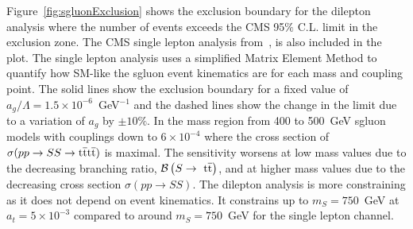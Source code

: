 


Figure~\ref{fig:sgluonExclusion} shows the exclusion boundary for the dilepton analysis where the number of events exceeds the CMS 95$\%$ C.L. limit in the exclusion zone. The CMS single lepton analysis from~\cite{Chatrchyan:2013fea,Beck201548}, is also included in the plot. The single lepton analysis uses a simplified Matrix Element Method to quantify how SM-like the sgluon event kinematics are for each mass and coupling point. The solid lines show the exclusion boundary for a fixed value of $a_{g}/\Lambda = 1.5 \times 10^{-6}$~GeV$^{-1}$ and the dashed lines show the change in the limit due to a variation of $a_{g}$ by $\pm 10\%$. 
In the mass region from 400 to 500~GeV sgluon models with couplings down to $6\times10^{-4}$ where the cross section of $\sigma( pp \rightarrow SS \rightarrow \mathrm{t}\overline{\mathrm{t}}\mathrm{t}\overline{\mathrm{t}})$ is 
maximal. The sensitivity worsens at low mass values due to the decreasing branching ratio, $\mathcal{B}\left(S\rightarrow~\mathrm{t}\overline{\mathrm{t}} \right)$, and at higher mass values due to the decreasing cross section $\sigma( pp \rightarrow SS)$.
The dilepton analysis is more constraining as it does not depend on event kinematics. It constrains up to $ m_{S} = 750$~GeV at $a_t=5\times10^{-3}$ compared to around $ m_{S} = 750$~GeV for the single lepton channel. 

